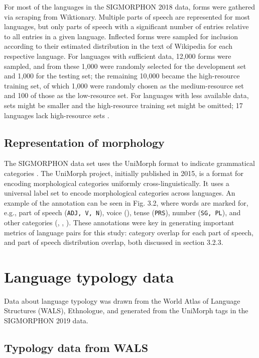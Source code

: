 For most of the languages in the SIGMORPHON 2018 data, forms were gathered via scraping from Wiktionary. Multiple parts of speech are represented for most languages, but only parts of speech with a significant number of entries relative to all entries in a given language. Inflected forms were sampled for inclusion according to their estimated distribution in the text of Wikipedia for each respective language. For languages with sufficient data, 12,000 forms were sampled, and from these 1,000 were randomly selected for the development set and 1,000 for the testing set; the remaining 10,000 became the high-resource training set, of which 1,000 were randomly chosen as the medium-resource set and 100 of those as the low-resource set. For languages with less available data, sets might be smaller and the high-resource training set might be omitted; 17 languages lack high-resource sets \parencite{Cotterell2018b}.

\subsection{Representation of morphology}

The SIGMORPHON data set uses the UniMorph format to indicate grammatical categories  \parencite{Cotterell2018b}. The UniMorph project, initially published in 2015, is a format for encoding morphological categories uniformly cross-linguistically. It uses a universal label set to encode morphological categories across languages. An example of the annotation can be seen in Fig. 3.2, where words are marked for, e.g., part of speech (\texttt{ADJ, V, N}), voice (), tense (\texttt{PRS}), number (\texttt{SG, PL}), and other categories (\cite{SylakGlassman2015}, \cite{SylakGlassman2015a}, \cite{SylakGlassman2016}). These annotations were key in generating important metrics of language pairs for this study: category overlap for each part of speech, and part of speech distribution overlap, both discussed in section 3.2.3.

\section{Language typology data}

Data about language typology was drawn from the World Atlas of Language Structures (WALS), Ethnologue, and generated from the UniMorph tags in the SIGMORPHON 2019 data.

\subsection{Typology data from WALS}

